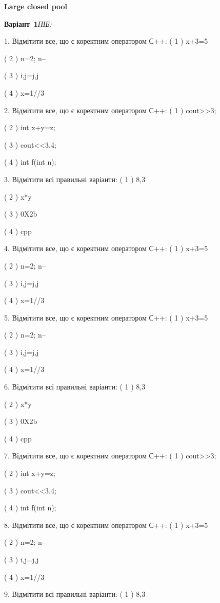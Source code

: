 \documentclass[11pt]{article}
\begin{document}
{\large\textbf{Large closed pool}}

\textbf{Варіант \No\,1}\hfill \textit{ПІБ:}\,\underline{\hspace{60mm}}
\vspace{4mm}

1. Відмітити все, що є коректним оператором С++:
( 1 ) x+3=5

( 2 ) n=2; n--

( 3 ) i,j=j,j

( 4 ) x=1//3

2. Відмітити все, що є коректним оператором С++:
( 1 ) cout>>3;

( 2 ) int x+y=z;

( 3 ) cout<<3.4;

( 4 ) int f(int n);

3. Відмітити всі правильні варіанти:
( 1 ) 8,3

( 2 ) x*y

( 3 ) 0X2b

( 4 ) cpp

4. Відмітити все, що є коректним оператором С++:
( 1 ) x+3=5

( 2 ) n=2; n--

( 3 ) i,j=j,j

( 4 ) x=1//3

5. Відмітити все, що є коректним оператором С++:
( 1 ) x+3=5

( 2 ) n=2; n--

( 3 ) i,j=j,j

( 4 ) x=1//3

6. Відмітити всі правильні варіанти:
( 1 ) 8,3

( 2 ) x*y

( 3 ) 0X2b

( 4 ) cpp

7. Відмітити все, що є коректним оператором С++:
( 1 ) cout>>3;

( 2 ) int x+y=z;

( 3 ) cout<<3.4;

( 4 ) int f(int n);

8. Відмітити все, що є коректним оператором С++:
( 1 ) x+3=5

( 2 ) n=2; n--

( 3 ) i,j=j,j

( 4 ) x=1//3

9. Відмітити всі правильні варіанти:
( 1 ) 8,3
\end{document}
